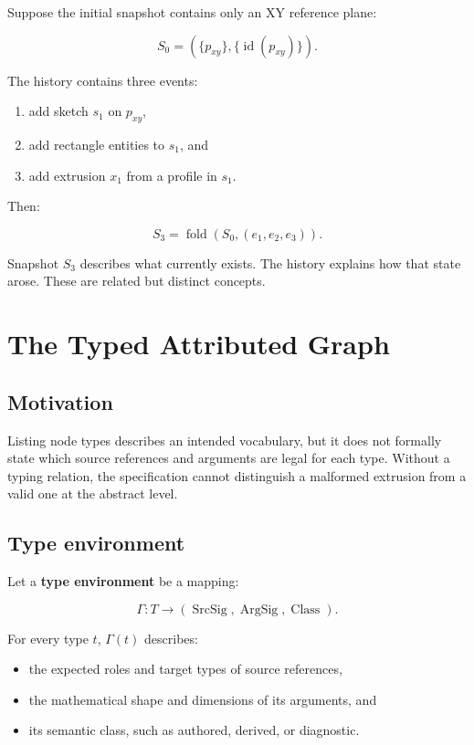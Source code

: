 \documentclass[11pt]{article}
\begin{document}
Suppose the initial snapshot contains only an XY reference plane:

\[
S_0=(\{p_{xy}\},\{\operatorname{id}(p_{xy})\}).
\]

The history contains three events:

\begin{enumerate}
  \item add sketch $s_1$ on $p_{xy}$,
  \item add rectangle entities to $s_1$, and
  \item add extrusion $x_1$ from a profile in $s_1$.
\end{enumerate}

Then:

\[
S_3=\operatorname{fold}(S_0,(e_1,e_2,e_3)).
\]

Snapshot $S_3$ describes what currently exists. The history explains how that
state arose. These are related but distinct concepts.

\section{The Typed Attributed Graph}

\subsection{Motivation}

Listing node types describes an intended vocabulary, but it does not formally
state which source references and arguments are legal for each type. Without a
typing relation, the specification cannot distinguish a malformed extrusion
from a valid one at the abstract level.

\subsection{Type environment}

Let a \textbf{type environment} be a mapping:

\[
\Gamma:T\rightarrow
(\operatorname{SrcSig},\operatorname{ArgSig},\operatorname{Class}).
\]

For every type $t$, $\Gamma(t)$ describes:

\begin{itemize}
  \item the expected roles and target types of source references,
  \item the mathematical shape and dimensions of its arguments, and
  \item its semantic class, such as authored, derived, or diagnostic.
\end{itemize}
\end{document}
